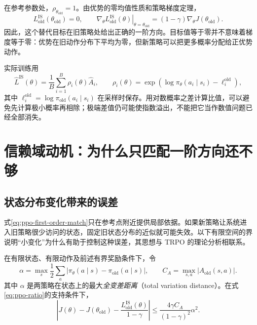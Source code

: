 \documentclass[UTF8,12pt,a4paper,fontset=fandol]{ctexart}
\begin{document}
在参考参数处，$\rho_{\theta_{\mathrm{old}}}=1$。由优势的零均值性质和策略梯度定理，
\begin{equation}
  L_{\mathrm{old}}^{\mathrm{IS}}(\theta_{\mathrm{old}})=0,
  \qquad
  \left.\nabla_\theta L_{\mathrm{old}}^{\mathrm{IS}}(\theta)
  \right|_{\theta=\theta_{\mathrm{old}}}
  =(1-\gamma)\nabla_\theta J(\theta_{\mathrm{old}}).
  \label{eq:ppo-first-order-match}
\end{equation}
因此，这个替代目标在旧策略处给出正确的一阶方向。目标值等于零并不意味着梯度等于零：优势在旧动作分布下平均为零，但新策略可以把更多概率分配给正优势动作。

实际训练用
\begin{equation}
  \widehat L^{\mathrm{IS}}(\theta)
  =\frac1B\sum_{i=1}^{B}\rho_i(\theta)\widehat A_i,
  \qquad
  \rho_i(\theta)=
  \exp\!\left(\log\pi_\theta(a_i\mid s_i)-\ell_i^{\mathrm{old}}\right),
  \label{eq:ppo-empirical-surrogate}
\end{equation}
其中 $\ell_i^{\mathrm{old}}=\log\pi_{\mathrm{old}}(a_i\mid s_i)$ 在采样时保存。用对数概率之差计算比值，可以避免先计算极小概率再相除；极端差值仍可能使指数溢出，不能把它当作数值问题已经全部消失。

\section{信赖域动机：为什么只匹配一阶方向还不够}
\label{sec:ppo-trust-region}

\subsection{状态分布变化带来的误差}

式\eqref{eq:ppo-first-order-match}只在参考点附近提供局部依据。如果新策略让系统进入旧策略很少访问的状态，固定旧状态分布的近似就可能失效。以下有限空间的界说明“小变化”为什么有助于控制这种误差，其思想与 TRPO 的理论分析相联系\cite{schulman-trpo}。

\begin{proposition}[一个替代目标误差界]
\label{prop:ppo-surrogate-bound}
在有限状态、有限动作及前述有界奖励条件下，令
\[
  \alpha=\max_s\frac12\sum_a
    |\pi_\theta(a\mid s)-\pi_{\mathrm{old}}(a\mid s)|,
  \qquad
  C_A=\max_{s,a}|A_{\mathrm{old}}(s,a)|.
\]
其中 $\alpha$ 是两策略在状态上的最大\emph{全变差距离}（total variation distance）。在式\eqref{eq:ppo-ratio}的支持条件下，
\begin{equation}
  \left|J(\theta)-J(\theta_{\mathrm{old}})
       -\frac{L_{\mathrm{old}}^{\mathrm{IS}}(\theta)}{1-\gamma}\right|
  \le \frac{4\gamma C_A}{(1-\gamma)^2}\alpha^2.
  \label{eq:ppo-surrogate-bound}
\end{equation}
\end{proposition}
\end{document}
